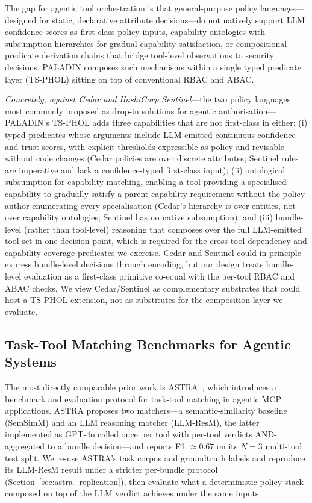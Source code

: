 \documentclass[10pt,a4paper,twocolumn]{article}
\begin{document}
The gap for agentic tool orchestration is that general-purpose policy languages---designed for static, declarative attribute decisions---do not natively support LLM confidence scores as first-class policy inputs, capability ontologies with subsumption hierarchies for gradual capability satisfaction, or compositional predicate derivation chains that bridge tool-level observations to security decisions. PALADIN composes such mechanisms within a single typed predicate layer (TS-PHOL) sitting on top of conventional RBAC and ABAC.

\textit{Concretely, against Cedar and HashiCorp Sentinel}---the two policy languages most commonly proposed as drop-in solutions for agentic authorisation---PALADIN's TS-PHOL adds three capabilities that are not first-class in either: (i) typed predicates whose arguments include LLM-emitted continuous confidence and trust scores, with explicit thresholds expressible as policy and revisable without code changes (Cedar policies are over discrete attributes; Sentinel rules are imperative and lack a confidence-typed first-class input); (ii) ontological subsumption for capability matching, enabling a tool providing a specialised capability to gradually satisfy a parent capability requirement without the policy author enumerating every specialisation (Cedar's hierarchy is over entities, not over capability ontologies; Sentinel has no native subsumption); and (iii) bundle-level (rather than tool-level) reasoning that composes over the full LLM-emitted tool set in one decision point, which is required for the cross-tool dependency and capability-coverage predicates we exercise. Cedar and Sentinel could in principle express bundle-level decisions through encoding, but our design treats bundle-level evaluation as a first-class primitive co-equal with the per-tool RBAC and ABAC checks. We view Cedar/Sentinel as complementary substrates that could host a TS-PHOL extension, not as substitutes for the composition layer we evaluate.

\subsection{Task-Tool Matching Benchmarks for Agentic Systems}
\label{sec:task_tool_matching}

The most directly comparable prior work is ASTRA~\cite{elhelou2025astra}, which introduces a benchmark and evaluation protocol for task-tool matching in agentic MCP applications. ASTRA proposes two matchers---a semantic-similarity baseline (SemSimM) and an LLM reasoning matcher (LLM-ResM), the latter implemented as GPT-4o called once per tool with per-tool verdicts AND-aggregated to a bundle decision---and reports F1 $\approx 0.67$ on its $N=3$ multi-tool test split. We re-use ASTRA's task corpus and groundtruth labels and reproduce its LLM-ResM result under a stricter per-bundle protocol (Section~\ref{sec:astra_replication}), then evaluate what a deterministic policy stack composed on top of the LLM verdict achieves under the same inputs.
\end{document}
